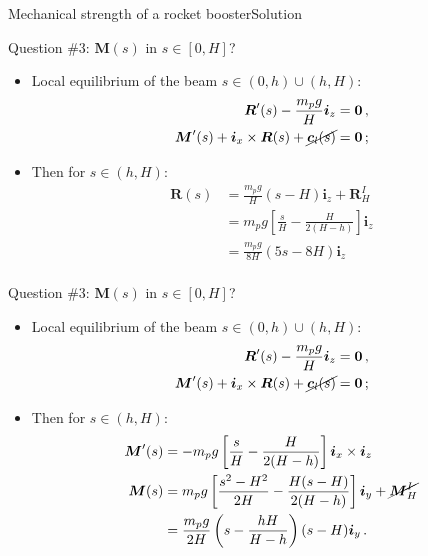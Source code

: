 \documentclass{beamer}
\newcommand{\cj}{c}
\newcommand{\cv}{{\boldsymbol\cj}}
\newcommand{\xj}{x}
\newcommand{\yj}{y}
\newcommand{\zj}{z}
\renewcommand{\ij}{i}
\newcommand{\iv}{{\boldsymbol\ij}}
\newcommand{\Rj}{R}
\newcommand{\Rv}{{\boldsymbol\Rj}}
\newcommand{\Fresj}{R}
\newcommand{\Mresj}{M}
\newcommand{\Fres}{{\boldsymbol\Fresj}}
\newcommand{\Mres}{{\boldsymbol\Mresj}}
\newcommand{\bzero}{{\bf 0}}
\begin{document}
\begin{frame}{Mechanical strength of a rocket booster}{Solution}
\begin{overprint}
\vskip-20pt
\begin{exampleblock}{Question \#3: $\Mres(s)$ in $s\in[0,H]$?}
\begin{itemize}
\item Local equilibrium of the beam $s\in(0,h)\cup(h,H)$:
\begin{displaymath}
\begin{split}
\Fres'(s)-\frac{m_p g}{H}\iv_\zj &=\bzero\,, \\
\Mres'(s)+\iv_\xj\times\Fres(s)+\cancel{\cv_l(s)} &=\bzero\,;
\end{split}
\end{displaymath}
\item Then for $s\in(h,H)$:
\begin{displaymath}
\begin{split}
\Fres(s) &=\frac{m_p g}{H}(s-H)\iv_\zj+\Rv_H^I  \\
&=m_p g\left[\frac{s}{H}-\frac{H}{2(H-h)}\right]\iv_\zj \\
&=\frac{m_p g}{8H}(5s-8H)\iv_\zj \\
\end{split}
\end{displaymath}
\end{itemize}
\end{exampleblock}

\vskip-20pt
\begin{exampleblock}{Question \#3: $\Mres(s)$ in $s\in[0,H]$?}
\begin{itemize}
\item Local equilibrium of the beam $s\in(0,h)\cup(h,H)$:
\begin{displaymath}
\begin{split}
\Fres'(s)-\frac{m_p g}{H}\iv_\zj &=\bzero\,, \\
\Mres'(s)+\iv_\xj\times\Fres(s)+\cancel{\cv_l(s)} &=\bzero\,;
\end{split}
\end{displaymath}
\item Then for $s\in(h,H)$:
\begin{displaymath}
\begin{split}
\Mres'(s) &=-m_p g\left[\frac{s}{H}-\frac{H}{2(H-h)}\right]\iv_\xj\times\iv_\zj \\
\Mres(s) &=m_p g\left[\frac{s^2-H^2}{2H}-\frac{H(s-H)}{2(H-h)}\right]\iv_\yj +\cancel{\Mres_H^I} \\
&=\frac{m_p g}{2H}\left(s-\frac{hH}{H-h}\right)(s-H)\iv_\yj\,.
\end{split}
\end{displaymath}
\end{itemize}
\end{exampleblock}


\end{overprint}
\end{frame}
\end{document}
